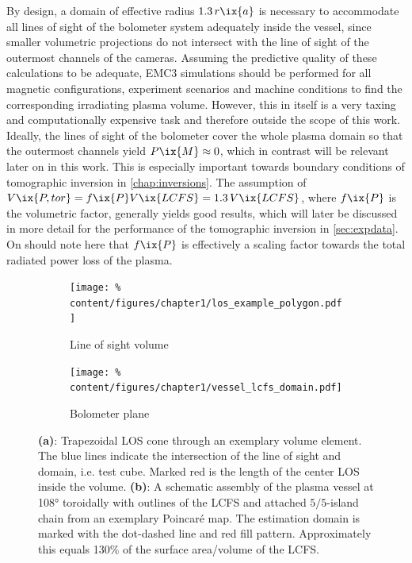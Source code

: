 %
            By design, a domain of effective radius $1.3\,r\ix{a}$ is necessary to accommodate all lines of sight of the bolometer system adequately inside the vessel, since smaller volumetric projections do not intersect with the line of sight of the outermost channels of the cameras. Assuming the predictive quality of these calculations to be adequate, EMC3 simulations should be performed for all magnetic configurations, experiment scenarios and machine conditions to find the corresponding irradiating plasma volume. However, this in itself is a very taxing and computationally expensive task and therefore outside the scope of this work. Ideally, the lines of sight of the bolometer cover the whole plasma domain so that the outermost channels yield $P\ix{M}\approx 0$, which in contrast will be relevant later on in this work. This is especially important towards boundary conditions of tomographic inversion in \cref{chap:inversions}. The assumption of $V\ix{P, tor}=f\ix{P}V\ix{LCFS}=1.3\,V\ix{LCFS}$, where $f\ix{P}$ is the volumetric factor, generally yields good results, which will later be discussed in more detail for the performance of the tomographic inversion in \cref{sec:expdata}. On should note here that $f\ix{P}$ is effectively a scaling factor towards the total radiated power loss of the plasma.\\%
%
            \begin{figure}[t]%
                \centering%
                \begin{subfigure}{0.43\textwidth}%
                    \texttt{[image: \%
                        content/figures/chapter1/los\_example\_polygon.pdf]}%
                    \caption{Line of sight volume}\label{fig:los_volume_example}%
                \end{subfigure}%
                \hspace*{1.0cm}%
                \begin{subfigure}{0.52\textwidth}%
                    \texttt{[image: \%
                        content/figures/chapter1/vessel\_lcfs\_domain.pdf]}%
                    \caption{Bolometer plane}\label{fig:domain_schematic}%
                \end{subfigure}%
                \caption{\textbf{(a)}: Trapezoidal LOS cone through an exemplary volume element. The blue lines indicate the intersection of the line of sight and domain, i.e. test cube. Marked red is the length of the center LOS inside the volume. \textbf{(b)}: A schematic assembly of the plasma vessel at 108° toroidally with outlines of the LCFS and attached $5/5$-island chain from an exemplary Poincaré  map. The estimation domain is marked with the dot-dashed line and red fill pattern. Approximately this equals 130\% of the surface area/volume of the LCFS.}\label{fig:torus_domain}%
            \end{figure}%
